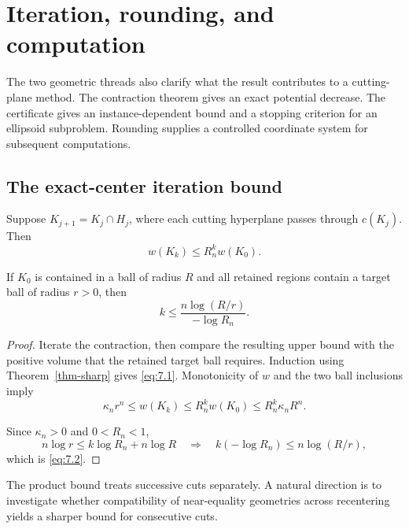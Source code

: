 \section{Iteration, rounding, and computation}\label{sec:7}

The two geometric threads also clarify what the result contributes to a cutting-plane method. The contraction theorem gives an exact potential decrease. The certificate gives an instance-dependent bound and a stopping criterion for an ellipsoid subproblem. Rounding supplies a controlled coordinate system for subsequent computations.

\subsection{The exact-center iteration bound}\label{sec:7.1}

\begin{corollary}\label{cor-iteration}
Suppose
$K_{j+1}=K_j\cap H_j$, where each cutting hyperplane passes through $c(K_j)$. Then
\begin{equation}\label{eq:7.1}
w(K_k)\le R_n^k w(K_0).
\end{equation}

If $K_0$ is contained in a ball of radius $R$ and all retained regions contain a target ball of radius $r>0$, then
\begin{equation}\label{eq:7.2}
k\le\frac{n\log(R/r)}{-\log R_n}.
\end{equation}

\end{corollary}

\begin{proof}
Iterate the contraction, then compare the resulting upper bound
with the positive volume that the retained target ball requires.
Induction using Theorem~\ref{thm-sharp} gives \eqref{eq:7.1}. Monotonicity of $w$ and the two ball inclusions imply
\begin{equation}\label{eq:7.3}
\kappa_n r^n\le w(K_k)\le R_n^k w(K_0)\le R_n^k\kappa_n R^n.
\end{equation}

Since $\kappa_n>0$ and $0<R_n<1$,
\begin{equation}\label{eq:7.4}
n\log r\le k\log R_n+n\log R
\quad\Longrightarrow\quad
k(-\log R_n)\le n\log(R/r),
\end{equation}
which is \eqref{eq:7.2}. 
\end{proof}

The product bound treats successive cuts separately. A natural direction is to investigate whether compatibility of near-equality geometries across recentering yields a sharper bound for consecutive cuts.

